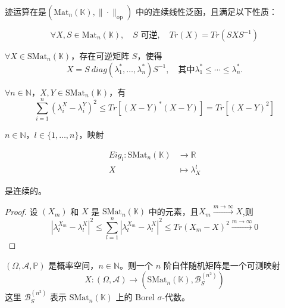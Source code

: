 \begin{lemma}
    迹运算在是\((\text{Mat}_n(\mathbb{K}), \|\cdot\|_{\text{op}})\) 中的连续线性泛函，且满足以下性质：

\begin{equation*}
\forall X, S \in \text{Mat}_n(\mathbb{K}), \quad S \text{ 可逆}, \quad Tr(X) = Tr(SXS^{-1})
\end{equation*}
\end{lemma}
\begin{lemma}
     \(\forall X \in \text{SMat}_n(\mathbb{K})\)，存在可逆矩阵 \(S\)，使得
\[X = S \ diag(\lambda_1^*, \ldots, \lambda_n^*)  S^{-1}, \quad\text{其中} \lambda_1^* \leq \cdots \leq \lambda_n^*.\]

\end{lemma}

\begin{theorem}
     \(\forall n \in \mathbb{N}\)，\(X, Y \in \text{SMat}_n(\mathbb{K})\)，有
\begin{equation*}
\sum_{i=1}^n (\lambda_i^X - \lambda_i^Y)^2 \leq Tr[(X-Y)^*(X-Y)] = Tr[(X-Y)^2]
\end{equation*}
\end{theorem}

\begin{corollary}
    \(n \in \mathbb{N}\)，\(l \in \{1, \ldots, n\}\)，映射

\begin{equation*}
\begin{aligned}
    {Eig}_l : \text{SMat}_n(\mathbb{K}) &\to \mathbb{R}\\
    X &\mapsto \lambda_X^l
\end{aligned}
\end{equation*}

是连续的。
\end{corollary}

\begin{proof}
    设 \((X_m)\) 和 \(X\) 是 \(\text{SMat}_n(\mathbb{K})\) 中的元素，且$X_m \xrightarrow{m \to \infty} X$,则
\begin{equation*}
|\lambda_l^{X_m} - \lambda_l^X |^2 \leq \sum_{l=1}^n |\lambda_l^{X_m} - \lambda_l^X|^2 \leq Tr(X_m - X)^2 \xrightarrow{m \to \infty} 0
\end{equation*}
\end{proof}
\begin{definition}
     \( (\Omega,\mathcal{A},\mathbb{P}) \) 是概率空间，\( n \in \mathbb{N} \)。则一个 \(n\) 阶自伴随机矩阵是一个可测映射
\begin{equation*}
X : (\Omega, \mathcal{A}) \to (\text{SMat}_n (\mathbb{K}), \mathcal{B}_S^{(n^2)})
\end{equation*}
这里 \(\mathcal{B}_S^{(n^2)}\) 表示 \(\text{SMat}_n(\mathbb{K})\) 上的 Borel \(\sigma\)-代数。
\end{definition}

